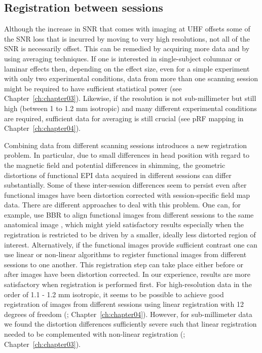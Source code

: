 \subsection{Registration between sessions}
Although the increase in SNR that comes with imaging at UHF offsets some of the SNR loss that is incurred by moving to very high resolutions, not all of the SNR is necessarily offset. This can be remedied by acquiring more data and by using averaging techniques. If one is interested in single-subject columnar or laminar effects then, depending on the effect size, even for a simple experiment with only two experimental conditions, data from more than one scanning session might be required to have sufficient statistical power (see Chapter~\ref{ch:chapter03}). Likewise, if the resolution is not sub-millimeter but still high (between 1 to 1.2 mm isotropic) and many different experimental conditions are required, sufficient data for averaging is still crucial (see pRF mapping in Chapter~\ref{ch:chapter04}).

Combining data from different scanning sessions introduces a new registration problem. In particular, due to small differences in head position with regard to the magnetic field and potential differences in shimming, the geometric distortions of functional EPI data acquired in different sessions can differ substantially. Some of these inter-session differences seem to persist even after functional images have been distortion corrected with session-specific field map data. There are different approaches to deal with this problem. One can, for example, use BBR to align functional images from different sessions to the same anatomical image \parencite{Nasr2016}, which might yield satisfactory results especially when the registration is restricted to be driven by a smaller, ideally less distorted region of interest. Alternatively, if the functional images provide sufficient contrast one can use linear \parencite{Jenkinson2001, Jenkinson2002} or non-linear algorithms \parencite{Andersson2007} to register functional images from different sessions to one another. This registration step can take place either before or after images have been distortion corrected. In our experience, results are more satisfactory when registration is performed first. For high-resolution data in the order of 1.1 - 1.2 mm isotropic, it seems to be possible to achieve good registration of images from different sessions using linear registration with 12 degrees of freedom (\cite{Gulban2018b}; Chapter~\ref{ch:chapter04}). However, for sub-millimeter data we found the distortion differences sufficiently severe such that linear registration needed to be complemented with non-linear registration (\cite{Schneider2019}; Chapter~\ref{ch:chapter03}).

